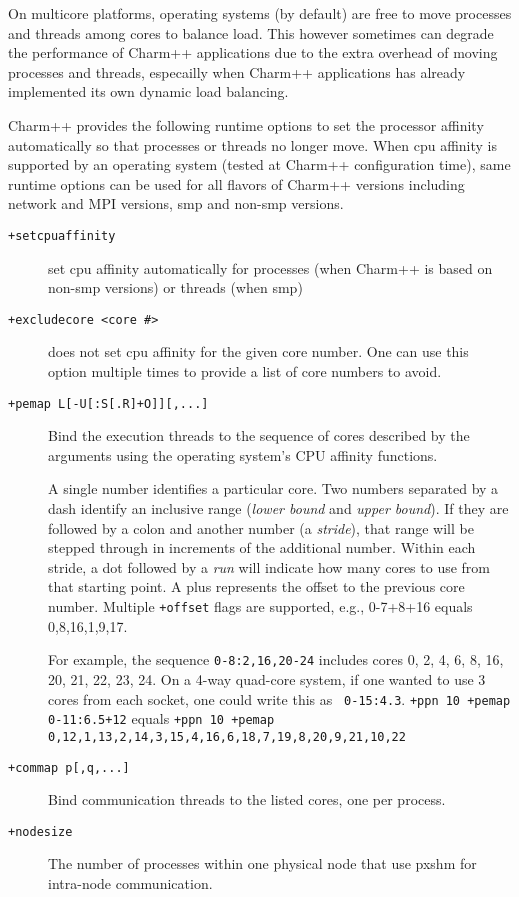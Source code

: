 On multicore platforms, operating systems (by default) are free to move
processes and threads among cores to balance load. This however sometimes can
degrade the performance of Charm++ applications due to the extra overhead of
moving processes and threads, especailly when Charm++ applications has already
implemented its own dynamic load balancing.

Charm++ provides the following runtime options to set the processor affinity
automatically so that processes or threads no longer move. When cpu affinity
is supported by an operating system (tested at Charm++ configuration time),
same runtime options can be used for all flavors of Charm++ versions including
network and MPI versions, smp and non-smp versions.

\begin{description}

\item[{\tt +setcpuaffinity}]             set cpu affinity automatically for processes (when Charm++ is based on non-smp versions) or threads (when smp)

\item[{\tt +excludecore <core \#>}]       does not set cpu affinity for the given core number. One can use this option multiple times to provide a list of core numbers to avoid.

\item[{\tt +pemap L[-U[:S[.R]+O]][,...]}] Bind the execution threads to
  the sequence of cores described by the arguments using the operating
  system's CPU affinity functions.

A single number identifies a particular core. Two numbers separated by
a dash identify an inclusive range (\emph{lower bound} and \emph{upper
  bound}). If they are followed by a colon and another number (a
\emph{stride}), that range will be stepped through in increments of
the additional number. Within each stride, a dot followed by a
\emph{run} will indicate how many cores to use from that starting
point. A plus represents the offset to the previous core number. 
Multiple {\tt +offset} flags are supported, e.g., 0-7+8+16 equals 0,8,16,1,9,17.

For example, the sequence {\tt 0-8:2,16,20-24} includes cores 0, 2, 4,
6, 8, 16, 20, 21, 22, 23, 24. On a 4-way quad-core system, if one
wanted to use 3 cores from each socket, one could write this as {\tt
0-15:4.3}. {\tt +ppn 10 +pemap 0-11:6.5+12} equals {\tt +ppn 10 +pemap 
0,12,1,13,2,14,3,15,4,16,6,18,7,19,8,20,9,21,10,22}

\item[{\tt +commap p[,q,...]}] Bind communication threads to the
  listed cores, one per process.

\item[{\tt +nodesize } ] The number of processes within one physical node
that use pxshm for intra-node communication.

\end{description}

